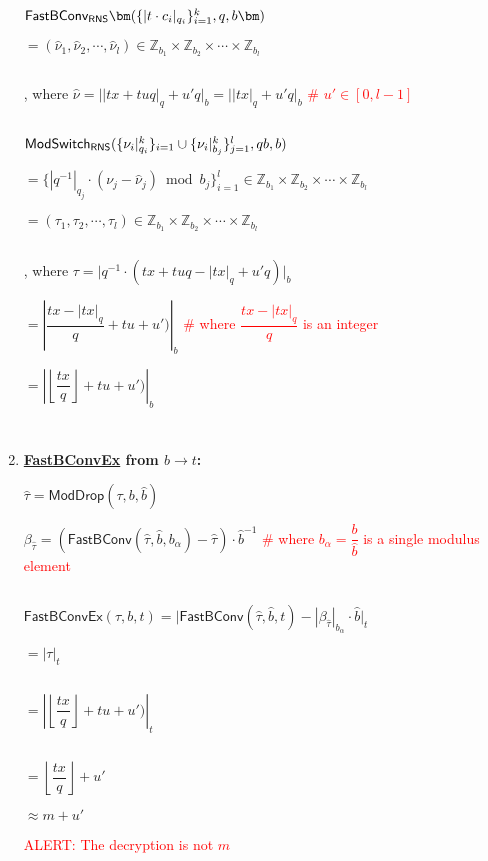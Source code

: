 \begin{enumerate}
$\textsf{FastBConv\textsubscript{RNS}}\bm(\{|t\cdot c_i|_{q_i}\}_{i=1}^k, q, b\bm)$

$ = (\hat\nu_1, \hat\nu_2, \cdots, \hat\nu_l) \in \mathbb{Z}_{b_1} \times \mathbb{Z}_{b_2} \times \cdots \times \mathbb{Z}_{b_l}$ 

$ $

, where $\hat\nu = \Big||tx + tuq|_{q} + u'q\Big|_b = \Big||tx|_{q} + u'q\Big|_b$ \textcolor{red}{\# $u' \in [0, l-1]$}

$ $

$\textsf{ModSwitch\textsubscript{RNS}}(\{\nu_i|_{q_i}^k\}_{i=1} \cup \{\nu_i|_{b_j}^k\}_{j=1}^l, qb, b)$

$ = \{|q^{-1}|_{q_j} \cdot (\nu_j - \hat{\nu}_j) \bmod b_j\}_{i=1}^{l} \in \mathbb{Z}_{b_1} \times \mathbb{Z}_{b_2} \times \cdots \times \mathbb{Z}_{b_l}$ 

$ = (\tau_1, \tau_2, \cdots, \tau_l) \in \mathbb{Z}_{b_1} \times \mathbb{Z}_{b_2} \times \cdots \times \mathbb{Z}_{b_l}$

$ $

, where $\tau = \Big|q^{-1}\cdot(tx + tuq - |tx|_{q} + u'q)\Big|_b$

$ = \left|\dfrac{tx - |tx|_{q}}{q} + tu + u')\right|_b$ \textcolor{red}{ \# where $\dfrac{tx - |tx|_{q}}{q}$ is an integer}

$ = \left|\left\lfloor\dfrac{tx}{q}\right\rfloor + tu + u')\right|_b$


$ $

$ $

\item \textbf{\underline{\textsf{FastBConvEx}} from $b \rightarrow t$:} 

$\hat{\tau} = \textsf{ModDrop}(\tau, b, \hat{b})$ 

$\beta_{\hat{\tau}} = (\textsf{FastBConv}(\hat{\tau}, \hat{b}, b_\alpha) - \hat{\tau})\cdot \hat{b}^{-1}$ \textcolor{red}{ \# where $b_\alpha = \dfrac{b}{\hat b}$ is a single modulus element}

$ $

$\textsf{FastBConvEx}(\tau, b, t) = \Big|\textsf{FastBConv}(\hat{\tau}, \hat{b}, t) - |\beta_{\hat{\tau}}|_{b_{\alpha}} \cdot\hat{b}\Big|_t $

$= |\tau|_t$

$ $

$ = \left|\left\lfloor\dfrac{tx}{q}\right\rfloor + tu + u')\right|_t$

$ $

$ = \left\lfloor\dfrac{tx}{q}\right\rfloor + u'$

$ \approx m + u'$

\textcolor{red}{ALERT: The decryption is not $m$}

\end{enumerate}